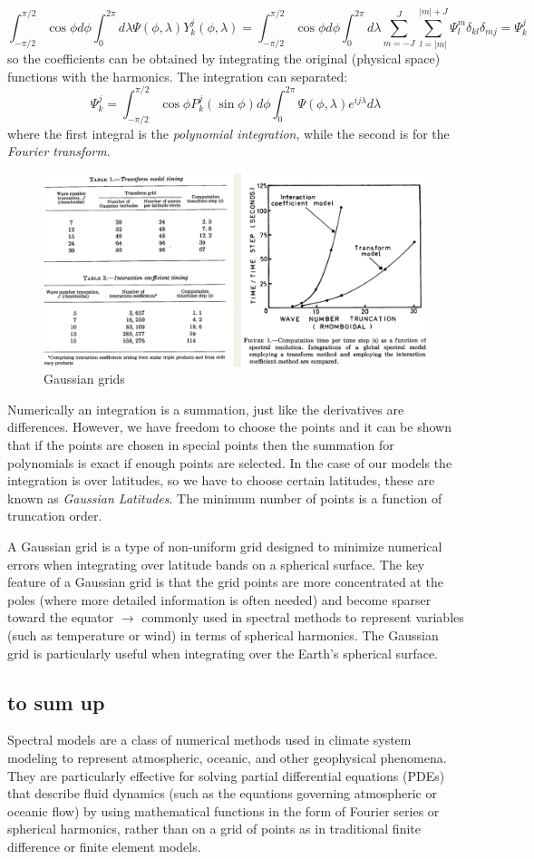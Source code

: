 \[\int_{-\pi/2}^{\pi/2}\cos\phi d\phi\int_0^{2\pi}d\lambda\Psi(\phi,\lambda) Y_k^j(\phi,\lambda)=\int_{-\pi/2}^{\pi/2}\cos\phi d\phi\int_0^{2\pi}d\lambda\displaystyle\sum_{m=-J}^J\displaystyle\sum_{l=|m|}^{|m|+J}\Psi_l^m\delta_{kl}\delta_{mj}=\Psi_k^j\]
so the coefficients can be obtained by integrating the original (physical space) functions with the harmonics. The integration can separated: 
\begin{equation}
    \Psi_k^j=\int_{-\pi/2}^{\pi/2}\cos\phi P_k^j(\sin\phi)d\phi\int_0^{2\pi}\Psi(\phi, \lambda)e^{ij\lambda}d\lambda
\end{equation}
where the first integral is the \textit{polynomial integration}, while the second is for the \textit{Fourier transform}.

\begin{figure}[h]
    \centering
    \includegraphics[width=0.5\linewidth]{uploads/Screenshot 2024-11-18 100538.png}
    \caption{Gaussian grids}
    \label{fig:gaussian grids}
\end{figure}

Numerically an integration is a summation, just like the derivatives are differences. However, we have freedom to choose the points and it can be shown that if the points are chosen in special points then the summation for polynomials is exact if enough points are selected. In the case of our models the integration is over latitudes, so we have
to choose certain latitudes, these are known as \textit{Gaussian Latitudes}. The minimum number of points is a function of truncation order.


A Gaussian grid is a type of non-uniform grid designed to minimize numerical errors when integrating over latitude bands on a spherical surface. The key feature of a Gaussian grid is that the grid points are more concentrated at the poles (where more detailed information is often needed) and become sparser toward the equator $\rightarrow$ commonly used in spectral methods to represent variables (such as temperature or wind) in terms of spherical harmonics. The Gaussian grid is particularly useful when integrating over the Earth's spherical surface.

\subsection{to sum up}
Spectral models are a class of numerical methods used in climate system modeling to represent atmospheric, oceanic, and other geophysical phenomena. They are particularly effective for solving partial differential equations (PDEs) that describe fluid dynamics (such as the equations governing atmospheric or oceanic flow) by using mathematical functions in the form of Fourier series or spherical harmonics, rather than on a grid of points as in traditional finite difference or finite element models. \\

